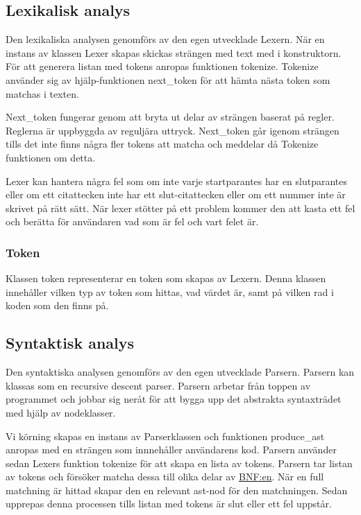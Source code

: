 \documentclass{TDP003mall}
\begin{document}
\subsection{Lexikalisk analys}
Den lexikaliska analysen genomförs av den egen utvecklade Lexern. 
När en instans av klassen Lexer skapas skickas strängen med text med i konstruktorn.
För att generera listan med tokens anropas funktionen tokenize. Tokenize använder sig av hjälp-funktionen next\_token för att hämta nästa token som matchas i texten.

Next\_token fungerar genom att bryta ut delar av strängen baserat på regler. Reglerna är uppbyggda av reguljära uttryck.
Next\_token går igenom strängen tills det inte finns några fler tokens att matcha och meddelar då Tokenize funktionen om detta.

Lexer kan hantera några fel som om inte varje startparantes har en slutparantes eller om ett citattecken inte har ett slut-citattecken eller om ett nummer inte är skrivet på rätt sätt.
När lexer stötter på ett problem kommer den att kasta ett fel och berätta för användaren vad som är fel och vart felet är.

\subsubsection{Token}
Klassen token representerar en token som skapas av Lexern.
Denna klassen innehåller vilken typ av token som hittas, vad värdet är, samt på vilken rad i koden som den finns på.

\subsection{Syntaktisk analys}
Den syntaktiska analysen genomförs av den egen utvecklade Parsern.
Parsern kan klassas som en recursive descent parser.
Parsern arbetar från toppen av programmet och jobbar sig neråt för att bygga upp det abstrakta syntaxträdet med hjälp av nodeklasser.

Vi körning skapas en instans av Parserklassen och funktionen produce\_ast anropas med en strängen som innnehåller användarens kod.
Parsern använder sedan Lexers funktion tokenize för att skapa en lista av tokens.
Parsern tar listan av tokens och försöker matcha dessa till olika delar av \hyperref[sec:BNF]{BNF:en}.
När en full matchning är hittad skapar den en relevant ast-nod för den matchningen.
Sedan upprepas denna processen tills listan med tokens är slut eller ett fel uppstår.
\end{document}
